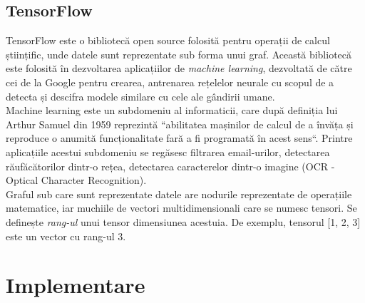 \documentclass[a4paper,12pt]{report}
\newcommand\tab[1][1cm]{\hspace*{#1}}
\begin{document}
\section{TensorFlow}
\tab TensorFlow este o bibliotecă open source folosită pentru operații de calcul științific, unde datele sunt reprezentate sub forma unui graf. 
Această bibliotecă este folosită în dezvoltarea aplicațiilor de \textit{machine learning}, dezvoltată de către cei de la Google pentru crearea, antrenarea 
rețelelor neurale cu scopul de a detecta și descifra modele similare cu cele ale gândirii umane.
\\ \tab Machine learning este un subdomeniu al informaticii, care după definiția lui Arthur Samuel din 1959 reprezintă ``abilitatea mașinilor de calcul de a învăța și reproduce o anumită funcționalitate
fară a fi programată în acest sens``. Printre aplicațiile acestui subdomeniu se regăsesc filtrarea email-urilor, detectarea răufăcătorilor dintr-o rețea, detectarea caracterelor dintr-o imagine (OCR - Optical Character 
Recognition). 
\\ \tab Graful sub care sunt reprezentate datele are nodurile reprezentate de operațiile matematice, iar muchiile
de vectori multidimensionali care se numesc tensori. Se definește \textit{rang-ul} unui tensor dimensiunea acestuia. De exemplu, tensorul [1, 2, 3] este un vector cu rang-ul 3. 

\chapter{Implementare}
\end{document}
